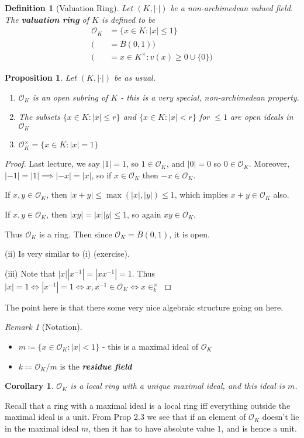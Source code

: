 \documentclass[]{article}
\theoremstyle{custhm}
\theoremstyle{cusdef}
\newtheorem{defin}[theorem]{Definition}
\theoremstyle{custhm}
\theoremstyle{custhm}
\newtheorem{cor}[theorem]{Corollary}
\theoremstyle{custhm}
\newtheorem{prop}[theorem]{Proposition}
\theoremstyle{custhm}
\theoremstyle{cusdef}
\theoremstyle{remark}
\newtheorem*{remark*}{Remark}
\newcommand{\undf}[1]{\textit{\textbf{#1}}}
\newcommand{\valk}{(K,|\cdot|)}
\renewcommand{\bar}{\overline}
\renewcommand{\O}{\mathcal{O}}
\begin{document}
\begin{defin}[Valuation Ring]
	Let $\valk$ be a non-archimedean valued field. The \undf{valuation ring} of $K$ is defined to be
\begin{align*}
	\O_K &= \{x\in K: |x|\le 1\}\\
	(&= \bar{B}(0,1))\\
	 (&=  x\in K^\times:v(x)\ge 0 \cup\{0\})
	\end{align*}
\end{defin}
\begin{prop} Let $\valk$ be as usual.
\begin{enumerate}[label = (\roman*)]
	\item $\O_K$ is an open subring of $K$ - this is a very special, non-archimedean property.
	\item The subsets $\{x\in K : |x| \le r\}$ and $\{x \in K : |x| < r\}$ for $\le 1$ are open ideals in $\O_K$
	\item $\O_K^\times = \{x\in K: |x| = 1\}$
\end{enumerate}
\end{prop}
\begin{proof}
Last lecture, we say $|1| = 1$, so $1\in \O_K$, and $|0| = 0$ so $0\in \O_K$. Moreover, $|-1| = |1|\implies |-x| = |x|$, so if $x\in \O_K$ then $-x \in \O_K$.

If $x,y\in \O_K$, then $|x+y|\le \max(|x|,|y|)\le 1$, which implies $x+y\in \O_K$ also.

If $x,y\in \O_K$, then $|xy| = |x||y|\le 1$, so again $xy\in \O_K$.

Thus $\O_K$ is a ring. Then since $\O_K = \bar{B}(0,1)$, it is open.

(ii) Is very similar to (i) (exercise).

(iii) Note that $|x||x^{-1}| = |xx^{-1}| = 1$. Thus $|x| = 1 \iff |x^{-1}| = 1\iff x,x^{-1} \in \O_K \iff x \in 
_k^\times$
\end{proof}

The point here is that there some very nice algebraic structure going on here.

\begin{remark*}[Notation]
\begin{itemize}
	\item $m\coloneqq \{x\in \O_K : |x| < 1\}$ - this is a maximal ideal of $\O_K$
	\item $k\coloneqq \O_K/m$ is the \undf{residue field}
\end{itemize}
\end{remark*}
\begin{cor}
$\O_K$ is a local ring with a unique maximal ideal, and this ideal is $m$.
\end{cor}
Recall that a ring with a maximal ideal is a local ring iff everything outside the maximal ideal is a unit. From Prop 2.3 we see that if an element of $\O_K$ doesn't lie in the maximal ideal $m$, then it has to have absolute value $1$, and is hence a unit.
\end{document}
